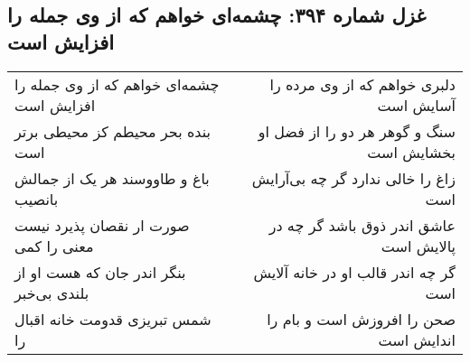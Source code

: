 \begin{center}
\section*{غزل شماره ۳۹۴: چشمه‌ای خواهم که از وی جمله را افزایش است}
\label{sec:0394}
\begin{longtable}{l p{0.5cm} r}
چشمه‌ای خواهم که از وی جمله را افزایش است
&&
دلبری خواهم که از وی مرده را آسایش است
\\
بنده بحر محیطم کز محیطی برتر است
&&
سنگ و گوهر هر دو را از فضل او بخشایش است
\\
باغ و طاووسند هر یک از جمالش بانصیب
&&
زاغ را خالی ندارد گر چه بی‌آرایش است
\\
صورت ار نقصان پذیرد نیست معنی را کمی
&&
عاشق اندر ذوق باشد گر چه در پالایش است
\\
بنگر اندر جان که هست او از بلندی بی‌خبر
&&
گر چه اندر قالب او در خانه آلایش است
\\
شمس تبریزی قدومت خانه اقبال را
&&
صحن را افروزش است و بام را اندایش است
\\
\end{longtable}
\end{center}
